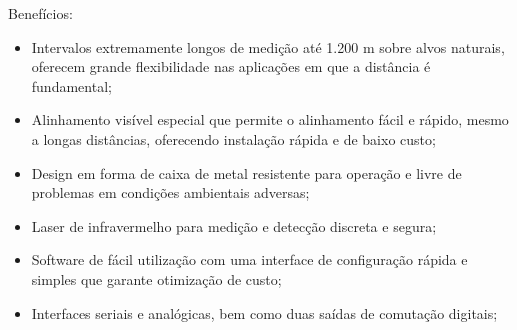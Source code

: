 Benefícios:
\begin{itemize}
	\item Intervalos extremamente longos de medição até 1.200 m sobre alvos naturais, oferecem grande flexibilidade nas aplicações em que a distância é fundamental;

	\item Alinhamento visível especial que permite o alinhamento fácil e rápido, mesmo a longas distâncias, oferecendo instalação rápida e de baixo custo;

	\item Design em forma de caixa de metal resistente para operação e livre de problemas em condições ambientais adversas;

	\item Laser de infravermelho para medição e detecção discreta e segura;
	\item Software de fácil utilização com uma interface de configuração rápida e simples que garante otimização de custo;
	\item Interfaces seriais e analógicas, bem como duas saídas de comutação digitais;
\end{itemize}

